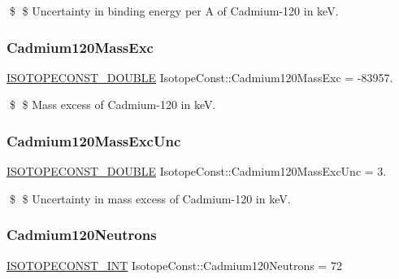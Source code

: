 \$ \$ Uncertainty in binding energy per A of Cadmium-\/120 in keV. \mbox{\label{group___isotope_const-_cadmium-_cd120_ga43d15511b2ff127c58b5c5dd9e73532e}} 
\subsubsection{\texorpdfstring{Cadmium120\+Mass\+Exc}{Cadmium120MassExc}}
{\footnotesize\ttfamily \mbox{\hyperlink{group___isotope_const-_macros_ga8f45a7272ce02c0b4c65c44636ed719a}{I\+S\+O\+T\+O\+P\+E\+C\+O\+N\+S\+T\+\_\+\+D\+O\+U\+B\+LE}} Isotope\+Const\+::\+Cadmium120\+Mass\+Exc = -\/83957.}

\$ \$ Mass excess of Cadmium-\/120 in keV. \mbox{\label{group___isotope_const-_cadmium-_cd120_ga7341163e52a996076abb76786f78ba49}} 
\subsubsection{\texorpdfstring{Cadmium120\+Mass\+Exc\+Unc}{Cadmium120MassExcUnc}}
{\footnotesize\ttfamily \mbox{\hyperlink{group___isotope_const-_macros_ga8f45a7272ce02c0b4c65c44636ed719a}{I\+S\+O\+T\+O\+P\+E\+C\+O\+N\+S\+T\+\_\+\+D\+O\+U\+B\+LE}} Isotope\+Const\+::\+Cadmium120\+Mass\+Exc\+Unc = 3.}

\$ \$ Uncertainty in mass excess of Cadmium-\/120 in keV. \mbox{\label{group___isotope_const-_cadmium-_cd120_gaa99a719a21c8677b8f3e946ef26fdb15}} 
\subsubsection{\texorpdfstring{Cadmium120\+Neutrons}{Cadmium120Neutrons}}
{\footnotesize\ttfamily \mbox{\hyperlink{group___isotope_const-_macros_ga5f18360b3e99483a35c32d789e62621c}{I\+S\+O\+T\+O\+P\+E\+C\+O\+N\+S\+T\+\_\+\+I\+NT}} Isotope\+Const\+::\+Cadmium120\+Neutrons = 72}

